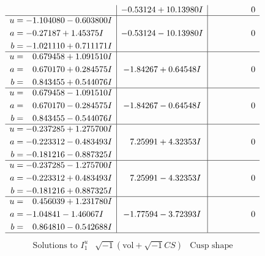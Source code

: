 \documentclass[1p]{elsarticle_modified}
\theoremstyle{definition}
\newcommand{\I}{\sqrt{-1}}
\begin{document}
$$\begin{array}{c|c|c}
 & -0.53124 + 10.13980 I & \phantom{-0.000000 } 0 \\ \hline\begin{aligned}
u &= -1.104080 - 0.603800 I \\
a &= -0.27187 + 1.45375 I \\
b &= -1.021110 + 0.711171 I\end{aligned}
 & -0.53124 - 10.13980 I & \phantom{-0.000000 } 0 \\ \hline\begin{aligned}
u &= \phantom{-}0.679458 + 1.091510 I \\
a &= \phantom{-}0.670170 + 0.284575 I \\
b &= \phantom{-}0.843455 + 0.544076 I\end{aligned}
 & -1.84267 + 0.64548 I & \phantom{-0.000000 } 0 \\ \hline\begin{aligned}
u &= \phantom{-}0.679458 - 1.091510 I \\
a &= \phantom{-}0.670170 - 0.284575 I \\
b &= \phantom{-}0.843455 - 0.544076 I\end{aligned}
 & -1.84267 - 0.64548 I & \phantom{-0.000000 } 0 \\ \hline\begin{aligned}
u &= -0.237285 + 1.275700 I \\
a &= -0.223312 - 0.483493 I \\
b &= -0.181216 - 0.887325 I\end{aligned}
 & \phantom{-}7.25991 + 4.32353 I & \phantom{-0.000000 } 0 \\ \hline\begin{aligned}
u &= -0.237285 - 1.275700 I \\
a &= -0.223312 + 0.483493 I \\
b &= -0.181216 + 0.887325 I\end{aligned}
 & \phantom{-}7.25991 - 4.32353 I & \phantom{-0.000000 } 0 \\ \hline\begin{aligned}
u &= \phantom{-}0.456039 + 1.231780 I \\
a &= -1.04841 - 1.46067 I \\
b &= \phantom{-}0.864810 - 0.542688 I\end{aligned}
 & -1.77594 - 3.72393 I & \phantom{-0.000000 } 0\\
 \hline 
 \end{array}$$\newpage$$\begin{array}{c|c|c}  
\text{Solutions to }I^u_{1}& \I (\text{vol} + \sqrt{-1}CS) & \text{Cusp shape}\\

\end{array}$$
\end{document}

